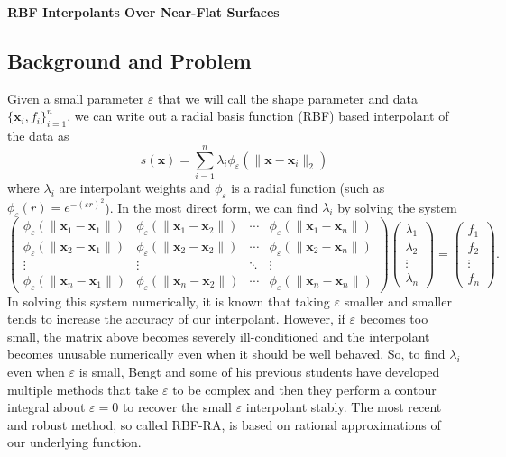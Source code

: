 \documentclass[a4paper,11pt]{article}
\newcommand{\eps}{\varepsilon}
\newcommand{\norm}[1]{\lVert #1 \rVert}
\newcommand{\pmat}[1]{\begin{pmatrix} #1 \end{pmatrix}}
\begin{document}
\begin{center}
	{\Large\textbf{RBF Interpolants Over Near-Flat Surfaces}}
\end{center}

\subsection*{Background and Problem}
Given a small parameter $ \eps $ that we will call the shape parameter and data $ \{\mathbf{x}_i, f_i\}_{i = 1}^n $, we can write out a radial basis function (RBF) based interpolant of the data as
\begin{equation}
	s(\mathbf{x}) = \sum_{i = 1}^n \lambda_i \phi_\eps(\norm{\mathbf{x} - \mathbf{x}_i}_2) \label{func:interp}
\end{equation}
where $ \lambda_i $ are interpolant weights and $ \phi_\eps $ is a radial function (such as $ \phi_\eps(r) = e^{-(\eps r)^2} $). In the most direct form, we can find $ \lambda_i $ by solving the system
\[
	\pmat{
		\phi_\eps (\norm{\mathbf{x}_1 - \mathbf{x}_1}) & \phi_\eps (\norm{\mathbf{x}_1 - \mathbf{x}_2}) & \cdots & \phi_\eps (\norm{\mathbf{x}_1 - \mathbf{x}_n}) \\
		\phi_\eps (\norm{\mathbf{x}_2 - \mathbf{x}_1}) & \phi_\eps (\norm{\mathbf{x}_2 - \mathbf{x}_2}) & \cdots & \phi_\eps (\norm{\mathbf{x}_2 - \mathbf{x}_n}) \\
		\vdots & \vdots & \ddots & \vdots \\
		\phi_\eps (\norm{\mathbf{x}_n - \mathbf{x}_1}) & \phi_\eps (\norm{\mathbf{x}_n - \mathbf{x}_2}) & \cdots & \phi_\eps (\norm{\mathbf{x}_n - \mathbf{x}_n})
	} \pmat{
		\lambda_1 \\ \lambda_2 \\ \vdots \\ \lambda_n
	} = \pmat{
		f_1 \\ f_2 \\ \vdots \\ f_n
	}.
\]
In solving this system numerically, it is known that taking $ \eps $ smaller and smaller tends to increase the accuracy of our interpolant. However, if $ \eps $ becomes too small, the matrix above becomes severely ill-conditioned and the interpolant becomes unusable numerically even when it should be well behaved. So, to find $ \lambda_i $ even when $ \eps $ is small, Bengt and some of his previous students have developed multiple methods that take $ \eps $ to be complex and then they perform a contour integral about $ \eps = 0 $ to recover the small $ \eps $ interpolant stably. The most recent and robust method, so called RBF-RA, is based on rational approximations of our underlying function. 
\end{document}
